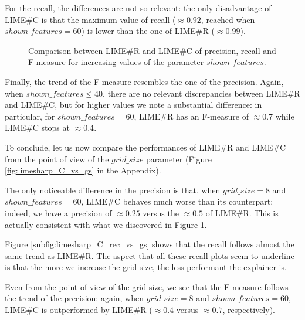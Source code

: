 \documentclass[12pt, twoside, a4paper]{report}
\begin{document}
For the recall, the differences are not so relevant: the only disadvantage of LIME\#C is that the maximum value of recall ($\approx 0.92$, reached when $shown\_features = 60$) is lower than the one of LIME\#R ($\approx 0.99$). 

\begin{figure}
\centering
{}
\caption{Comparison between LIME\#R and LIME\#C of precision, recall and F-measure for increasing values of the parameter $shown\_features$.}
\label{subfig:R-C-comparison}
\end{figure}

Finally, the trend of the F-measure resembles the one of the precision. Again, when $shown\_features \leq 40$, there are no relevant discrepancies between LIME\#R and LIME\#C, but for higher values we note a substantial difference: in particular, for $shown\_features = 60$, LIME\#R has an F-measure of $\approx 0.7$ while LIME\#C stops at $\approx 0.4$.
\bigskip

To conclude, let us now compare the performances of LIME\#R and LIME\#C from the point of view of the $grid\_size$ parameter (Figure \ref{fig:limesharp_C_vs_gs} in the Appendix). 

The only noticeable difference in the precision is that, when $grid\_size = 8$ and $shown\_features = 60$, LIME\#C behaves much worse than its counterpart: indeed, we have a precision of $\approx 0.25$ versus the $\approx 0.5$ of LIME\#R. This is actually consistent with what we discovered in Figure \ref{subfig:R-C-comparison}.

Figure \ref{subfig:limesharp_C_rec_vs_gs} shows that the recall follows almost the same trend as LIME\#R. The aspect that all these recall plots seem to underline is that the more we increase the grid size, the less performant the explainer is. 

Even from the point of view of the grid size, we see that the F-measure follows the trend of the precision: again, when $grid\_size = 8$ and $shown\_features = 60$, LIME\#C is outperformed by LIME\#R ($\approx 0.4$ versus $\approx 0.7$, respectively).

\newpage
\end{document}
